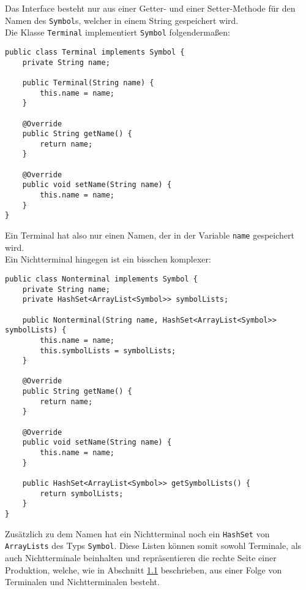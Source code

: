 Das Interface besteht nur aus einer Getter- und einer Setter-Methode für den Namen des \lstinline[columns=fixed]{Symbol}s, welcher in einem String gespeichert wird.\\
Die Klasse \lstinline[columns=fixed]{Terminal} implementiert \lstinline[columns=fixed]{Symbol} folgendermaßen:
\begin{lstlisting}[frame=single, basicstyle=\small, caption=Die Klasse \textit{Terminal}]
public class Terminal implements Symbol {
	private String name;
	
	public Terminal(String name) {
		this.name = name;
	}
	
	@Override
	public String getName() {
		return name;
	}
	
	@Override
	public void setName(String name) {
		this.name = name;
	}
}
\end{lstlisting}
Ein Terminal hat also nur einen Namen, der in der Variable \lstinline[columns=fixed]{name} gespeichert wird.\\
Ein Nichtterminal hingegen ist ein bisschen komplexer:
\begin{lstlisting}[frame=single, basicstyle=\small, caption=Die Klasse \textit{Nonterminal}]
public class Nonterminal implements Symbol {
	private String name;
	private HashSet<ArrayList<Symbol>> symbolLists;
	
	public Nonterminal(String name, HashSet<ArrayList<Symbol>> symbolLists) {
		this.name = name;
		this.symbolLists = symbolLists;
	}
	
	@Override
	public String getName() {
		return name;
	}
	
	@Override
	public void setName(String name) {
		this.name = name;
	}
	
	public HashSet<ArrayList<Symbol>> getSymbolLists() {
		return symbolLists;
	}
}
\end{lstlisting}
Zusätzlich zu dem Namen hat ein Nichtterminal noch ein \lstinline[columns=fixed]{HashSet} von \lstinline[columns=fixed]{ArrayLists} des Typs \lstinline[columns=fixed]{Symbol}. Diese Listen können somit sowohl Terminale, als auch Nichtterminale beinhalten und repräsentieren die rechte Seite einer Produktion, welche, wie in Abschnitt \hyperref[sec:1.1]{1.1} beschrieben, aus einer Folge von Terminalen und Nichtterminalen besteht.
